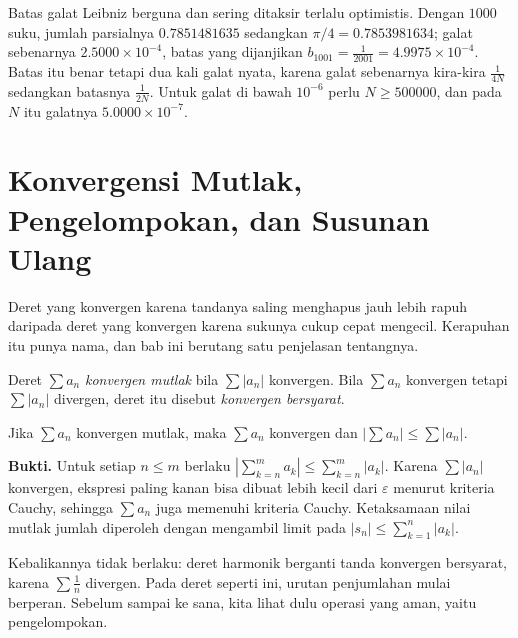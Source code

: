 Batas galat Leibniz berguna dan sering ditaksir terlalu optimistis. Dengan $1000$
suku, jumlah parsialnya $0.7851481635$ sedangkan $\pi/4 = 0.7853981634$; galat
sebenarnya $2.5000 \times 10^{-4}$, batas yang dijanjikan
$b_{1001} = \tfrac{1}{2001} = 4.9975 \times 10^{-4}$. Batas itu benar tetapi dua kali
galat nyata, karena galat sebenarnya kira-kira $\tfrac{1}{4N}$ sedangkan batasnya
$\tfrac{1}{2N}$. Untuk galat di bawah $10^{-6}$ perlu $N \ge 500000$, dan pada $N$ itu
galatnya $5.0000 \times 10^{-7}$.

\section{Konvergensi Mutlak, Pengelompokan, dan Susunan Ulang}

Deret yang konvergen karena tandanya saling menghapus jauh lebih rapuh daripada deret
yang konvergen karena sukunya cukup cepat mengecil. Kerapuhan itu punya nama, dan
bab ini berutang satu penjelasan tentangnya.

\begin{definisi}
Deret $\sum a_n$ \emph{konvergen mutlak} bila $\sum |a_n|$ konvergen. Bila
$\sum a_n$ konvergen tetapi $\sum |a_n|$ divergen, deret itu disebut
\emph{konvergen bersyarat}.
\end{definisi}


\begin{teorema}
Jika $\sum a_n$ konvergen mutlak, maka $\sum a_n$ konvergen dan
$\left| \sum a_n \right| \le \sum |a_n|$.
\end{teorema}

\noindent\textbf{Bukti.} Untuk setiap $n \le m$ berlaku
$\left| \sum_{k=n}^{m} a_k \right| \le \sum_{k=n}^{m} |a_k|$. Karena $\sum |a_n|$
konvergen, ekspresi paling kanan bisa dibuat lebih kecil dari $\varepsilon$ menurut
kriteria Cauchy, sehingga $\sum a_n$ juga memenuhi kriteria Cauchy. Ketaksamaan
nilai mutlak jumlah diperoleh dengan mengambil limit pada
$\left| s_n \right| \le \sum_{k=1}^{n} |a_k|$.

Kebalikannya tidak berlaku: deret harmonik berganti tanda konvergen bersyarat,
karena $\sum \frac{1}{n}$ divergen. Pada deret seperti ini, urutan penjumlahan mulai
berperan. Sebelum sampai ke sana, kita lihat dulu operasi yang aman, yaitu
pengelompokan.

